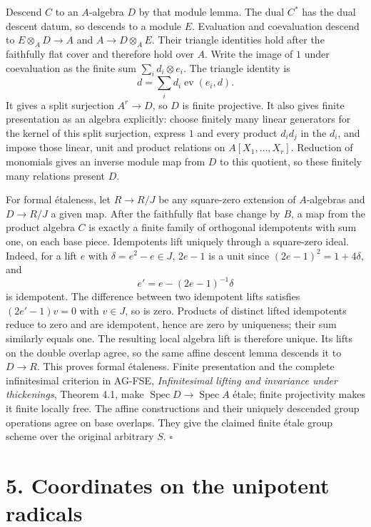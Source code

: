 \documentclass[11pt,a4paper,openany]{report}
\begin{document}
Descend \(C\) to an \(A\)-algebra \(D\) by that module lemma. The dual \(C^*\) has the dual descent datum, so descends to a module \(E\). Evaluation and coevaluation descend to \(E\otimes_A D\to A\) and \(A\to D\otimes_A E\). Their triangle identities hold after the faithfully flat cover and therefore hold over \(A\). Write the image of \(1\) under coevaluation as the finite sum \(\sum_i d_i\otimes e_i\). The triangle identity is \[
                    d=\sum_i d_i\operatorname{ev}(e_i,d).
\] It gives a split surjection \(A^r\to D\), so \(D\) is finite projective. It also gives finite presentation as an algebra explicitly: choose finitely many linear generators for the kernel of this split surjection, express \(1\) and every product \(d_i d_j\) in the \(d_i\), and impose those linear, unit and product relations on \(A[X_1,\ldots,X_r]\). Reduction of monomials gives an inverse module map from \(D\) to this quotient, so these finitely many relations present \(D\).

For formal étaleness, let \(R\to R/J\) be any square-zero extension of \(A\)-algebras and \(D\to R/J\) a given map. After the faithfully flat base change by \(B\), a map from the product algebra \(C\) is exactly a finite family of orthogonal idempotents with sum one, on each base piece. Idempotents lift uniquely through a square-zero ideal. Indeed, for a lift \(e\) with \(\delta=e^2-e\in J\), \(2e-1\) is a unit since \((2e-1)^2=1+4\delta\), and \[
                         e'=e-(2e-1)^{-1}\delta
\] is idempotent. The difference between two idempotent lifts satisfies \((2e'-1)v=0\) with \(v\in J\), so is zero. Products of distinct lifted idempotents reduce to zero and are idempotent, hence are zero by uniqueness; their sum similarly equals one. The resulting local algebra lift is therefore unique. Its lifts on the double overlap agree, so the same affine descent lemma descends it to \(D\to R\). This proves formal étaleness. Finite presentation and the complete infinitesimal criterion in AG-FSE, \emph{Infinitesimal lifting and invariance under thickenings}, Theorem 4.1, make \(\operatorname{Spec}D\to\operatorname{Spec}A\) étale; finite projectivity makes it finite locally free. The affine constructions and their uniquely descended group operations agree on base overlaps. They give the claimed finite étale group scheme over the original arbitrary \(S\). \(\square\)

\section{5. Coordinates on the unipotent radicals}\label{AG-RG-04-coordinates-on-the-unipotent-radicals}
\end{document}
